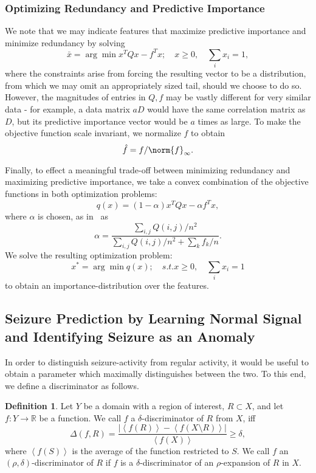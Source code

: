 \documentclass{article} %
\theoremstyle{definition}
\newtheorem{definition}{Definition}[section]
\theoremstyle{remark}
\newcommand{\mean}[1]{\left \langle #1 \right \rangle}
\newcommand{\abs}[1]{\left| #1 \right|}
\newcommand{\rl}{\mathbb{R}}
\renewcommand{\a}{\alpha}
\renewcommand{\d}{\delta}
\begin{document}
\subsubsection{Optimizing Redundancy and Predictive Importance}
We note that we may indicate features that maximize predictive importance and minimize redundancy by solving 
\[ \bar{x} = \arg \min x^T Q x - f^T x; \quad x \geq 0, \quad \sum_i x_i  = 1, \]
where the constraints arise from forcing the resulting vector to be a distribution, from which we may omit an appropriately sized tail, should we choose to do so. However, the magnitudes of entries in $Q, f$ may be vastly different for very similar data - for example, a data matrix $aD$ would have the same correlation matrix as $D$, but its predictive importance vector would be $a$ times as large. To make the objective function scale invariant, we normalize $f$ to obtain
\[ \hat{f} = f/\norm{f}_{\infty}. \]

Finally, to effect a meaningful trade-off between minimizing redundancy and maximizing predictive importance, we take a convex combination of the objective functions in both optimization problems:
\[ q(x) = (1 - \a) x^T Q x - \a  f^T x, \]
where $\a$ is chosen, as in~\cite{quadprog_featsel} as 
\[ \a  = \frac{\sum_{i, j} Q(i, j) /n^2}{\sum_{i, j} Q(i, j)/n^2 + \sum_k f_k / n}. \]
We solve the resulting optimization problem:
\[ x^* = \arg \min q(x); \quad s.t. x \geq 0, \quad \sum_i x_i = 1 \]
to obtain an importance-distribution over the features.

\subsection{Seizure Prediction by Learning Normal Signal and Identifying Seizure as an Anomaly} \label{sec:seizure_predict_method}
In order to distinguish seizure-activity from regular activity, it would be useful to obtain a parameter which maximally distinguishes between the two. To this end, we define a discriminator as follows.

\begin{definition}
Let $Y$ be a domain with a region of interest, $R \subset X$, and let $f: Y \to \rl$ be a function. We call $f$ a $\d$-discriminator of $R$ from $X$, iff
\[ \Delta(f, R) = \frac{\abs{\mean{f(R)} - \mean{f(X \setminus R)}}}{\mean{f(X)}} \geq \d, \]
where $\mean{f(S)}$ is the average of the function restricted to $S$.
We call $f$ an $(\rho, \delta)$-discriminator of $R$ if $f$ is a $\delta$-discriminator of an $\rho$-expansion of $R$ in $X$.
\end{definition}
\end{document}
